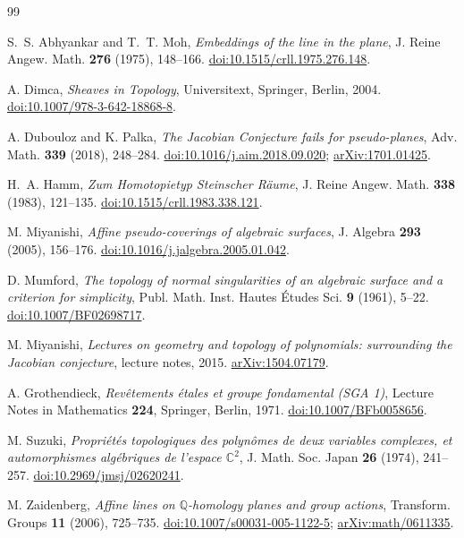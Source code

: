 \documentclass[11pt]{article}
\theoremstyle{definition}
\theoremstyle{remark}
\newcommand{\C}{\mathbb C}
\newcommand{\Q}{\mathbb Q}
\begin{document}
\begin{thebibliography}{99}

S.~S. Abhyankar and T.~T. Moh,
\emph{Embeddings of the line in the plane},
J. Reine Angew. Math. \textbf{276} (1975), 148--166.
\href{https://doi.org/10.1515/crll.1975.276.148}
{doi:10.1515/crll.1975.276.148}.

A. Dimca,
\emph{Sheaves in Topology},
Universitext, Springer, Berlin, 2004.
\href{https://doi.org/10.1007/978-3-642-18868-8}
{doi:10.1007/978-3-642-18868-8}.

A. Dubouloz and K. Palka,
\emph{The Jacobian Conjecture fails for pseudo-planes},
Adv. Math. \textbf{339} (2018), 248--284.
\href{https://doi.org/10.1016/j.aim.2018.09.020}
{doi:10.1016/j.aim.2018.09.020};
\href{https://arxiv.org/abs/1701.01425}{arXiv:1701.01425}.

H.~A. Hamm,
\emph{Zum Homotopietyp Steinscher R\"aume},
J. Reine Angew. Math. \textbf{338} (1983), 121--135.
\href{https://doi.org/10.1515/crll.1983.338.121}
{doi:10.1515/crll.1983.338.121}.

M. Miyanishi,
\emph{Affine pseudo-coverings of algebraic surfaces},
J. Algebra \textbf{293} (2005), 156--176.
\href{https://doi.org/10.1016/j.jalgebra.2005.01.042}
{doi:10.1016/j.jalgebra.2005.01.042}.

D. Mumford,
\emph{The topology of normal singularities of an algebraic surface
and a criterion for simplicity},
Publ. Math. Inst. Hautes \'Etudes Sci. \textbf{9} (1961), 5--22.
\href{https://doi.org/10.1007/BF02698717}
{doi:10.1007/BF02698717}.

M. Miyanishi,
\emph{Lectures on geometry and topology of polynomials:
surrounding the Jacobian conjecture},
lecture notes, 2015.
\href{https://arxiv.org/abs/1504.07179}{arXiv:1504.07179}.

A. Grothendieck,
\emph{Rev\^etements \'etales et groupe fondamental (SGA 1)},
Lecture Notes in Mathematics \textbf{224}, Springer, Berlin, 1971.
\href{https://doi.org/10.1007/BFb0058656}
{doi:10.1007/BFb0058656}.

M. Suzuki,
\emph{Propri\'et\'es topologiques des polyn\^omes de deux variables
complexes, et automorphismes alg\'ebriques de l'espace \(\C^2\)},
J. Math. Soc. Japan \textbf{26} (1974), 241--257.
\href{https://doi.org/10.2969/jmsj/02620241}
{doi:10.2969/jmsj/02620241}.

M. Zaidenberg,
\emph{Affine lines on \(\Q\)-homology planes and group actions},
Transform. Groups \textbf{11} (2006), 725--735.
\href{https://doi.org/10.1007/s00031-005-1122-5}
{doi:10.1007/s00031-005-1122-5};
\href{https://arxiv.org/abs/math/0611335}{arXiv:math/0611335}.

\end{thebibliography}
\end{document}
